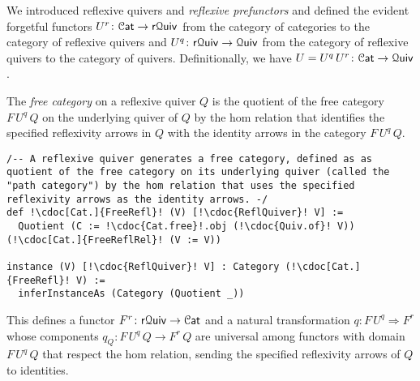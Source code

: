 \documentclass[a4paper,UKenglish,cleveref, autoref, thm-restate]{lipics-v2021}
\newcommand{\cat}[1]{\textup{\textsf{#1}}}%
\newcommand{\1}{\mathbbe{1}}
\newcommand{\2}{\mathbbe{2}}
\newcommand{\3}{\mathbbe{3}}
\newcommand{\Cat}{\mathcal{C}\cat{at}}
\newcommand{\Quiv}{\mathcal{Q}\cat{uiv}}
\newcommand{\rQuiv}{\cat{r}\mathcal{Q}\cat{uiv}}
\newcommand{\cdoc}[2][]{\href{https://leanprover-community.github.io/mathlib4_docs/find/?pattern=CategoryTheory.#1#2\#doc}{\texttt{#2}}}
\begin{document}
We introduced reflexive quivers and \emph{reflexive prefunctors} and defined the evident forgetful functors $U^r \colon \Cat \to \rQuiv$ from the category of categories to the category of reflexive quivers and $U^q \colon \rQuiv \to \Quiv$ from the category of reflexive quivers to the category of quivers. Definitionally, we have $U = U^q\,U^r \colon \Cat \to \Quiv$.


\begin{definition}[\cdoc{Cat.FreeRefl}] The \emph{free category} on a reflexive quiver $Q$ is the quotient of the free category $F\,U^q\,Q$ on the underlying quiver of $Q$ by the hom relation that identifies the specified reflexivity arrows in $Q$ with the identity arrows in the category $F\,U^q\,Q$.
\end{definition}

\begin{lstlisting}
/-- A reflexive quiver generates a free category, defined as as quotient of the free category on its underlying quiver (called the "path category") by the hom relation that uses the specified reflexivity arrows as the identity arrows. -/
def !\cdoc[Cat.]{FreeRefl}! (V) [!\cdoc{ReflQuiver}! V] :=
  Quotient (C := !\cdoc{Cat.free}!.obj (!\cdoc{Quiv.of}! V)) (!\cdoc[Cat.]{FreeReflRel}! (V := V))

instance (V) [!\cdoc{ReflQuiver}! V] : Category (!\cdoc[Cat.]{FreeRefl}! V) :=
  inferInstanceAs (Category (Quotient _))
\end{lstlisting}



This defines a functor $F^r \colon \rQuiv \to \Cat$ and a natural transformation $q \colon F\,U^q \Rightarrow F^r$ whose components $q_Q \colon F\,U^q\,Q \to F^r\,Q$ are universal among functors with domain $F\,U^q\,Q$ that respect the hom relation, sending the specified reflexivity arrows of $Q$ to identities.
\end{document}
